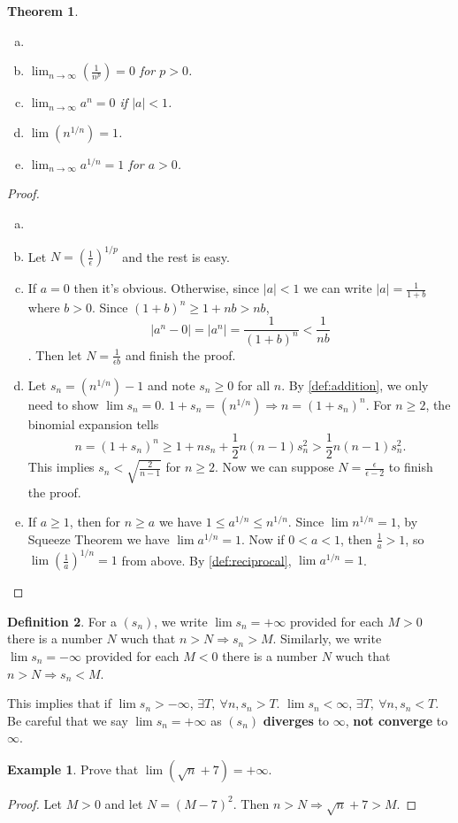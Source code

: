 \documentclass[12pt, lettersize]{book}
\theoremstyle{plain}
\newtheorem{thm}{Theorem}[section]
\theoremstyle{definition}
\newtheorem{dfn}[thm]{Definition}
\newtheorem*{eg}{Example}
\theoremstyle{remark}
\begin{document}
		\begin{thm}
		\begin{enumerate}[(a)]
			\item[]
			\item $\lim_{n\rightarrow\infty}(\frac{1}{n^p})=0$ for $p>0$.
			\item $\lim_{n\rightarrow\infty}a^n=0$ if $|a|<1$.
			\item $\lim(n^{1/n})=1$.
			\item $\lim_{n\rightarrow\infty}a^{1/n}=1$ for $a>0$.
		\end{enumerate}
		\end{thm}
		\begin{proof}
		\begin{enumerate}[(a)]
			\item[]
			\item Let $N=(\frac{1}{\epsilon})^{1/p}$ and the rest is easy.
			\item If $a=0$ then it's obvious. Otherwise, since $|a|<1$ we can write $|a|=\frac{1}{1+b}$ where $b>0$.
			Since $(1+b)^n\geq 1+nb>nb$,
			\begin{displaymath}
				|a^n-0|=|a^n|=\frac{1}{(1+b)^n}<\frac{1}{nb}
			\end{displaymath}.
		 	Then let $N=\frac{1}{\epsilon b}$ and finish the proof.
			\item Let $s_n=(n^{1/n})-1$ and note $s_n\geq0$ for all $n$. By \ref{def:addition}, we only need to show
			$\lim s_n=0$. $1+s_n=(n^{1/n})\Rightarrow n=(1+s_n)^n$. For $n\geq2$, the binomial expansion tells
			\begin{displaymath}
				n=(1+s_n)^n\geq1+ns_n+\frac{1}{2}n(n-1)s_n^2>\frac{1}{2}n(n-1)s_n^2.
			\end{displaymath}
			This implies $s_n<\sqrt{\frac{2}{n-1}}$ for $n\geq2$. Now we can suppose $N=\frac{\epsilon}{\epsilon-2}$ to finish the proof.
			\item If $a\geq1$, then for $n\geq a$ we have $1\leq a^{1/n}\leq n^{1/n}$.
			Since $\lim n^{1/n}=1$, by Squeeze Theorem we have $\lim a^{1/n}=1$. Now if $0<a<1$, then $\frac{1}{a}>1$, so
			$\lim (\frac{1}{a})^{1/n}=1$ from above. By \ref{def:reciprocal}, $\lim a^{1/n}=1$.
		\end{enumerate}
		\end{proof}
		
		\begin{dfn}
		For a $(s_n)$, we write $\lim s_n=+\infty$ provided for each $M>0$ there is a number $N$ wuch that $n>N\Rightarrow s_n>M$. Similarly, we write $\lim s_n=-\infty$ provided for each $M<0$ there is a number $N$ wuch that $n>N\Rightarrow s_n<M$.
		\end{dfn}
		This implies that if $\lim s_n>-\infty$, $\exists T,\ \forall n, s_n>T$. $\lim s_n<\infty$, $\exists T,\ \forall n, s_n<T$. 
		Be careful that we say $\lim s_n=+\infty$ as $(s_n)$ \textbf{diverges} to $\infty$, \textbf{not converge} to $\infty$.
		\begin{eg} 
		Prove that $\lim(\sqrt{n}+7)=+\infty$.
		\end{eg}
		\begin{proof}
		Let $M>0$ and let $N=(M-7)^2$. Then $n>N\Rightarrow \sqrt{n}+7>M$.
		\end{proof}
		
\end{document}
